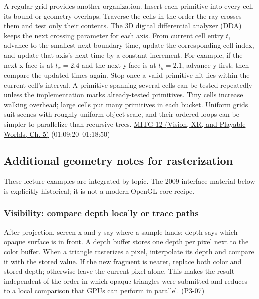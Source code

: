 A regular grid provides another organization. Insert each primitive into every cell its bound or geometry overlaps. Traverse the cells in the order the ray crosses them and test only their contents. The 3D digital differential analyzer (DDA) keeps the next crossing parameter for each axis. From current cell entry \(t\), advance to the smallest next boundary time, update the corresponding cell index, and update that axis's next time by a constant increment. For example, if the next x face is at \(t_x=2.4\) and the next y face is at \(t_y=2.1\), advance y first; then compare the updated times again. Stop once a valid primitive hit lies within the current cell's interval. A primitive spanning several cells can be tested repeatedly unless the implementation marks already-tested primitives. Tiny cells increase walking overhead; large cells put many primitives in each bucket. Uniform grids suit scenes with roughly uniform object scale, and their ordered loops can be simpler to parallelize than recursive trees. \href{../07-Vision-XR-and-Playable-Worlds/main.pdf\#nameddest=04-visual-computing-ii-ch036-mitg-12---ray-tracing-ii}{MITG-12 (Vision, XR, and Playable Worlds, Ch. 5)} (01:09:20--01:18:50)

\subsection{Additional geometry notes for rasterization}\label{04-visual-computing-ii-ch029-additional-geometry-notes-for-rasterization}

\hypertarget{04-visual-computing-ii-ch029-additional-geometry-notes-for-rasterization}{}

These lecture examples are integrated by topic. The 2009 interface material below is explicitly historical; it is not a modern OpenGL core recipe.

\subsubsection{Visibility: compare depth locally or trace paths}\label{04-visual-computing-ii-ch029-visibility-compare-depth-locally-or-trace-paths}

\hypertarget{04-visual-computing-ii-ch029-visibility-compare-depth-locally-or-trace-paths}{}

After projection, screen x and y say where a sample lands; depth says which opaque surface is in front. A depth buffer stores one depth per pixel next to the color buffer. When a triangle rasterizes a pixel, interpolate its depth and compare it with the stored value. If the new fragment is nearer, replace both color and stored depth; otherwise leave the current pixel alone. This makes the result independent of the order in which opaque triangles were submitted and reduces to a local comparison that GPUs can perform in parallel. (P3-07)

